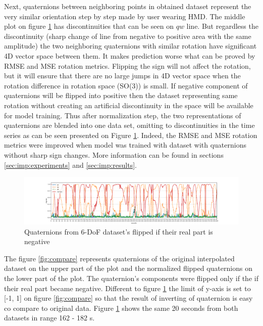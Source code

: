 Next, quaternions between neighboring points in obtained dataset represent the very similar orientation step by step made by user wearing HMD. The middle plot on figure \ref{fig:norm_data} has discontinuities that can be seen on $qw$ line. But regardless the discontinuity (sharp change of line from negative to positive area with the same amplitude) the two neighboring quaternions with similar rotation have significant 4D vector space between them. It makes prediction worse what can be proved by RMSE and MSE rotation metrics. Flipping the sign will not affect the rotation, but it will ensure that there are no large jumps in 4D vector space when the rotation difference in rotation space (SO(3)) is small. If negative component of quaternions will be flipped into positive then the dataset representing same rotation without creating an artificial discontinuity in the space will be available for model training. Thus after normalization step, the two representations of quaternions are blended into one data set, omitting to discontinuities in the time series as can be seen presented on Figure \ref{fig:norm_data}. Indeed, the RMSE and MSE rotation metrics were improved when model was trained with dataset with quaternions without sharp sign changes. More information can be found in sections \ref{sec:imp:experiments} and \ref{sec:imp:results}.

\begin{figure}[htb]
	\begin{center}
		\includegraphics[width=1\textwidth, keepaspectratio]{gfx/Fig-1556-quaternions_flipped.pdf}
		\caption{\label{fig:norm_data} Quaternions from 6-DoF dataset's flipped if their real part is negative}
	\end{center}
\end{figure}

The figure \ref{fig:compare} represents quaternions of the original interpolated dataset on the upper part of the plot and the normalized flipped quaternions on the lower part of the plot. The quaternion's components were flipped only if the if their real part became negative. Different to figure \ref{fig:norm_data} the limit of y-axis is set to [-1, 1] on figure  \ref{fig:compare} so that the result of inverting of quaternion is easy co compare to original data.  Figure \ref{fig:norm_data} shows the same 20 seconds from both datasets in range 162 - 182 s.

